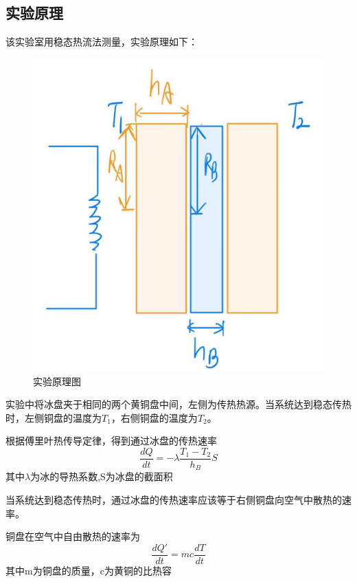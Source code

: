 \documentclass{article}
\begin{document}
    \subsection{实验原理}
     \songti{}\indent
     该实验室用稳态热流法测量，实验原理如下：
     \begin{figure}
       \centering
     \includegraphics[scale=0.2]{principle1}
     \caption{\heiti{}实验原理图}
     
     \end{figure}

    实验中将冰盘夹于相同的两个黄铜盘中间，左侧为传热热源。当系统达到稳态传热时，左侧铜盘的温度为$ T_1 $，右侧铜盘的温度为$ T_2 $。 
	    
	    
	     根据傅里叶热传导定律，得到通过冰盘的传热速率
	\begin{equation}
		 \dfrac{dQ}{dt}=-\lambda \dfrac{T_1-T_2}{h_B}S 
	\end{equation}
	其中$\lambda$为冰的导热系数,S为冰盘的截面积
	
	
	当系统达到稳态传热时，通过冰盘的传热速率应该等于右侧铜盘向空气中散热的速率。
	
	
	铜盘在空气中自由散热的速率为
\begin{equation}
		 \dfrac{dQ'}{dt}=mc\dfrac{dT}{dt} 
\end{equation}
其中m为铜盘的质量，c为黄铜的比热容
\end{document}
